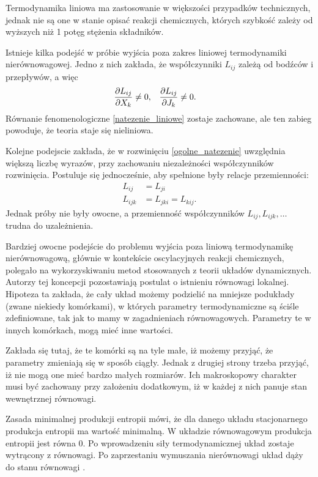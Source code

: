 \documentclass[10pt, a4paper, twoside, onecolumn]{article}
\numberwithin{equation}{section}
\begin{document}
	Termodynamika liniowa ma zastosowanie w większości przypadków technicznych, jednak nie są one w stanie opisać reakcji chemicznych, których szybkość zależy od wyższych niż 1 potęg stężenia składników. \par
	Istnieje kilka podejść w próbie wyjścia poza zakres liniowej termodynamiki nierównowagowej. Jedno z nich zakłada, że współczynniki \(L_{ij}\) zależą od bodźców i przepływów, a więc
	\begin{align}
		& \pdv{L_{ij}}{X_{k}}\neq 0, && \pdv{L_{ij}}{J_{k}}\neq 0.
	\end{align}
	Równanie fenomenologiczne \eqref{natezenie_liniowe} zostaje zachowane, ale ten zabieg powoduje, że teoria staje się nieliniowa. \par
	Kolejne podejscie zakłada, że w rozwinięciu \eqref{ogolne_natezenie} uwzględnia większą liczbę wyrazów, przy zachowaniu niezależności współczynników rozwinięcia. Postuluje się jednocześnie, aby spełnione były relacje przemienności:
	\begin{equation}
	\begin{split}
		L_{ij} &= L_{ji} \\
		L_{ijk} &= L_{jki} = L_{kij}.
	\end{split}
	\end{equation}
	Jednak próby nie były owocne, a przemienność współczynników \(L_{ij}, L_{ijk}, \ldots\) trudna do uzależnienia. \par
	Bardziej owocne podejście do problemu wyjścia poza liniową termodynamikę nierównowagową, głównie w kontekście oscylacyjnych reakcji chemicznych, polegało na wykorzyskiwaniu metod stosowanych z teorii układów dynamicznych. Autorzy tej koncepcji pozostawiają postulat o istnieniu równowagi lokalnej. Hipoteza ta zakłada, że cały układ możemy podzielić na mniejsze podukłady (zwane niekiedy komórkami), w których parametry termodynamiczne są ściśle zdefiniowane, tak jak to mamy w zagadnieniach równowagowych. Parametry te w innych komórkach, mogą mieć inne wartości. \par
	Zakłada się tutaj, że te komórki są na tyle małe, iż możemy przyjąć, że parametry zmieniają się w sposób ciągły. Jednak z drugiej strony trzeba przyjąć, iż nie mogą one mieć bardzo małych rozmiarów. Ich makroskopowy charakter musi być zachowany przy założeniu dodatkowym, iż w każdej z nich panuje stan wewnętrznej równowagi. \par
	Zasada minimalnej produkcji entropii mówi, że dla danego układu stacjonarnego produkcja entropii ma wartość minimalną. W układzie równowagowym produkcja entropii jest równa 0. Po wprowadzeniu siły termodynamicznej układ zostaje wytrącony z równowagi. Po zaprzestaniu wymuszania nierównowagi układ dąży do stanu równowagi \cite{orlik}. \par
\end{document}
